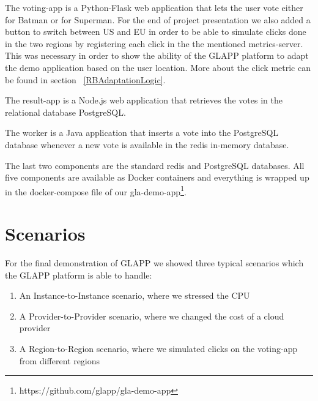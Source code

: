 \documentclass{seal_thesis}
\begin{document}
The voting-app is a Python-Flask web application that lets the user vote either for Batman or for Superman.%
For the end of project presentation we also added a button to switch between US and EU in order to be able to simulate clicks done in the two regions by registering each click in the the mentioned metrics-server.
This was necessary in order to show the ability of the GLAPP platform to adapt the demo application based on the user location.
More about the click metric can be found in section ~\ref{RBAdaptationLogic}.

The result-app is a Node.js web application that retrieves the votes in the relational database PostgreSQL.

The worker is a Java application that inserts a vote into the PostgreSQL database whenever a new vote is available in the redis in-memory database.

The last two components are the standard redis and PostgreSQL databases.
All five components are available as Docker containers and everything is wrapped up in the docker-compose file of our gla-demo-app\footnote{https://github.com/glapp/gla-demo-app}.


\section{Scenarios}
For the final demonstration of GLAPP we showed three typical scenarios which the GLAPP platform is able to handle:
\begin{enumerate}
	\item An Instance-to-Instance scenario, where we stressed the CPU
	\item A Provider-to-Provider scenario, where we changed the cost of a cloud provider
	\item A Region-to-Region scenario, where we simulated clicks on the voting-app from different regions
\end{enumerate}
\end{document}
